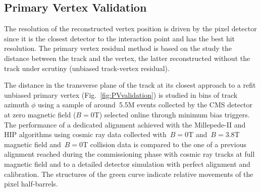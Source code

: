 \subsection{Primary Vertex Validation}
\label{sec:AlRes_PVvalid}

The resolution of the reconstructed vertex position is driven by the pixel detector since it is the closest detector to the interaction point and has the best hit resolution. The primary vertex residual method is based on the study the distance between the track and the vertex, the latter reconstructed without the track under scrutiny (unbiased track-vertex residual). 

The distance in the transverse plane of the track at its closest approach to a refit unbiased primary vertex (Fig.~\ref{fig:PVvalidation}) is studied in bins of track azimuth $\phi$ using a sample of around~5.5M events collected by the CMS detector at zero magnetic field ($B=0$T) selected online through minimum bias triggers. The performance of a dedicated alignment achieved with the Millepede-II and HIP algorithms using cosmic ray data collected with~$B=0$T and~$B=3.8$T magnetic field and~$B=0$T collision data is compared to the one of a previous alignment reached during the commissioning phase with cosmic ray tracks at full magnetic field and to a detailed detector simulation with perfect alignment and calibration. The structures of the green curve indicate relative movements of the pixel half-barrels.

